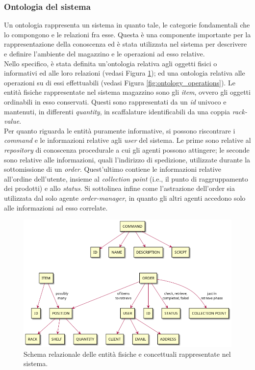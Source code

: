 \subsubsection{Ontologia del sistema}
Un ontologia rappresenta un sistema in quanto tale, le categorie fondamentali che lo compongono e le relazioni fra esse. Questa è una componente importante per la rappresentazione della conoscenza ed è stata utilizzata nel sistema per descrivere e definire l'ambiente del magazzino e le operazioni ad esso relative.\\
Nello specifico, è stata definita un'ontologia relativa agli oggetti fisici o informativi ed alle loro relazioni (vedasi Figura \ref{fig:ontology_abstractions}); ed una ontologia relativa alle operazioni su di essi effettuabili (vedasi Figura \ref{fig:ontology_operations}).
%
\parag
Le entità fisiche rappresentate nel sistema magazzino sono gli \textit{item}, ovvero gli oggetti ordinabili in esso conservati. Questi sono rappresentati da un \textit{id} univoco e mantenuti, in differenti \textit{quantity}, in scaffalature identificabili da una coppia \textit{rack-value}.\\
Per quanto riguarda le entità puramente informative, si possono riscontrare i \textit{command} e le informazioni relative agli \textit{user} del sistema. Le prime sono relative al \textit{repository} di conoscenza procedurale a cui gli agenti possono attingere; le seconde sono relative alle informazioni, quali l'indirizzo di spedizione, utilizzate durante la sottomissione di un \textit{order}. Quest'ultimo contiene le informazioni relative all'ordine dell'utente, insieme al \textit{collection point} (i.e., il punto di raggruppamento dei prodotti) e allo \textit{status}. Si sottolinea infine come l'astrazione dell'order sia utilizzata dal solo agente \textit{order-manager}, in quanto gli altri agenti accedono solo alle informazioni ad esso correlate.
\begin{figure}[ht]
    \includegraphics[width=\textwidth]{section/design/figure/ontology/ontology-abstractions.png}
    \caption{Schema relazionale delle entità fisiche e concettuali rappresentate nel sistema.}
    \label{fig:ontology_abstractions}
\end{figure}
